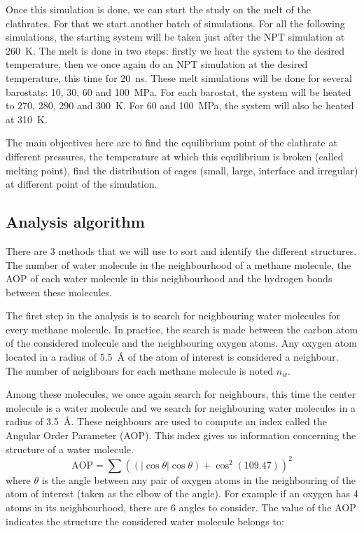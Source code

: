 Once this simulation is done, we can start the study on the melt of the clathrates. For that we start another batch of simulations. For all the following simulations, the starting system will be taken just after the NPT simulation at \SI{260}{\kelvin}. The melt is done in two steps: firstly we heat the system to the desired temperature, then we once again do an NPT simulation at the desired temperature, this time for \SI{20}{\nano\second}. These melt simulations will be done for several barostats: 10, 30, 60 and \SI{100}{\mega\pascal}. For each barostat, the system will be heated to 270, 280, 290 and \SI{300}{\kelvin}. For 60 and \SI{100}{\mega\pascal}, the system will also be heated at \SI{310}{\kelvin}.

The main objectives here are to find the equilibrium point of the clathrate at different pressures, the temperature at which this equilibrium is broken (called melting point), find the distribution of cages (small, large, interface and irregular) at different point of the simulation.

\subsection{Analysis algorithm}
There are 3 methods that we will use to sort and identify the different structures. The number of water molecule in the neighbourhood of a methane molecule, the AOP of each water molecule in this neighbourhood and the hydrogen bonds between these molecules.

The first step in the analysis is to search for neighbouring water molecules for every methane molecule. In practice, the search is made between the carbon atom of the considered molecule and the neighbouring oxygen atoms.
Any oxygen atom located in a radius of \SI{5.5}{\angstrom} of the atom of interest is considered a neighbour. The number of neighbours for each methane molecule is noted $n_w$.

Among these molecules, we once again search for neighbours, this time the center molecule is a water molecule and we search for neighbouring water molecules in a radius of \SI{3.5}{\angstrom}.
These neighbours are used to compute an index called the Angular Order Parameter (AOP). This index gives us information concerning the structure of a water molecule.
\[
    \text{AOP} = \sum \left( \left( \left|\cos \theta \right| \cos \theta \right) + \cos^2 (109.47)\right)^2
\]
where $\theta$ is the angle between any pair of oxygen atoms in the neighbouring of the atom of interest (taken as the elbow of the angle). For example if an oxygen has 4 atoms in its neighbourhood, there are 6 angles to consider. The value of the AOP indicates the structure the considered water molecule belongs to:

